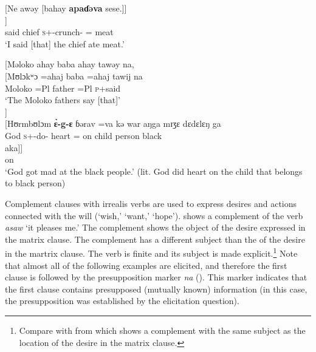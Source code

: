 \ea \label{ex:12:20}
{}[Ne awəy  [bahay  \textbf{apaɗəva}  sese.]]\\
\gll  [nɛ  awij   [bahaj  \textbf{à-paɗ-ə} \textbf{=va}  ʃɛʃɛ]]\\
      {\oneS}  said  chief  \textsc{s}+{\PFV}-crunch-{\CL} ={\PRF}  meat\\
\glt  ‘I said [that] the chief ate meat.’
\z 

\clearpage
\ea \label{ex:12:21}
{}[Məloko  ahay  baba  ahay  tawəy  na,\\  
\gll  {}[Mʊlɔkʷɔ  =ahaj   baba   =ahaj  tawij         na \\     
      Moloko     =Pl      father  =Pl     \textsc{p}+said    {\PSP}  \\    
\glt ‘The Moloko fathers say [that]’\\
      
]\\
\gll {}[Hʊrmbʊlɔm \textbf{\`ɛ-g-ɛ}  ɓərav   =va kə war aŋga mɪʒɛ dɛdɛlɛŋ ga\\ 
     \hspaceThis{[}God \textsc{s}+{\PFV}-do-{\CL} heart ={\PRF} on child {\POSS} person black  {\ADJ}\\ 
     
     \medskip
\gll aka]]\\
     on\\
\glt  ‘God got mad at the black people.’ (lit. God did heart on the child that belongs to black person)
\z 

Complement clauses with irrealis verbs are used to express desires and actions connected with the will (‘wish,’ ‘want,’ ‘hope’).    shows a complement of the verb \textit{asaw } ‘it pleases me.’ The complement shows the object of the desire expressed in the matrix clause. The complement has a different subject than the {\LOC} of the desire in the martrix clause. The verb is finite and its subject is made explicit.\footnote{Compare with  from  which shows a complement with the same subject as the location of the desire in the matrix clause.} Note that almost all of the following examples are elicited, and therefore the first clause is followed by the presupposition marker \textit{na} (). This marker indicates that the first clause contains presupposed (mutually known) information (in this case, the presupposition was established by the elicitation question). 

